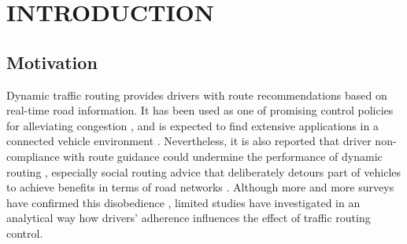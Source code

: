 \section{INTRODUCTION}

\subsection{Motivation}
Dynamic traffic routing provides drivers with route recommendations based on real-time road information. It has been used as one of  promising control policies for alleviating congestion  \cite{como2012robust_2, minh2022effective}, and is expected to find extensive applications in a connected vehicle environment \cite{han2020congestion, chen2021distributed}. Nevertheless, it is also reported that driver non-compliance with route guidance could undermine the performance of dynamic routing \cite{powell2000value}, especially social routing advice that deliberately detours part of vehicles to achieve benefits in terms of road networks \cite{van2019travelers}. Although more and more surveys have confirmed this disobedience \cite{dia2007modelling,kerkman2012car,djavadian2014empirical,van2020travelers, mariotte2021assessing}, limited studies have investigated in an analytical way how drivers' adherence influences the effect of traffic routing control.

